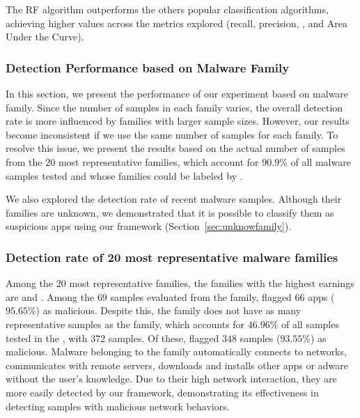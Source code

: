 \begin{finding}
  The RF algorithm outperforms the others popular classification algorithms, achieving higher values across the metrics explored (recall, precision, \fone, and Area Under the Curve).
\end{finding}



\subsubsection{Detection Performance based on Malware Family}\label{sec:family-assessment}

In this section, we present the performance of our experiment based on malware family. Since the number of samples in each family varies, the overall detection rate is more influenced by families with larger sample sizes. However, our results become inconsistent if we use the same number of samples for each family. To resolve this issue, we present the results based on the actual number of samples from the $20$ most representative families, which account for $90.9\%$ of all malware samples tested and whose families could be labeled by \vt.

We also explored the detection rate of recent malware samples. Although their families are unknown, we demonstrated that it is possible to classify them as suspicious apps using our framework (Section~\ref{sec:unknowfamily}).


\subsubsection{Detection rate of 20 most representative malware families}\label{sec:familyDetection}


Among the $20$ most representative families, the families with the highest earnings are \gps and \dwg. Among the $69$ samples evaluated from the \dwg family, \droidxpflow flagged $66$ apps ($95.65\%$) as malicious. Despite this, the \dwg family does not have as many representative samples as the \gps family, which accounts for $46.96\%$ of all samples tested in the \fds, with $372$ samples. Of these, \droidxpflow flagged $348$ samples ($93.55$\%) as malicious. Malware belonging to the \gps family automatically connects to networks, communicates with remote servers, downloads and installs other apps or adware without the user’s knowledge\cite{DBLP:journals/jnca/WangCYYPJ19}. Due to their high network interaction, they are more easily detected by our framework, demonstrating its effectiveness in detecting samples with malicious network behaviors.

